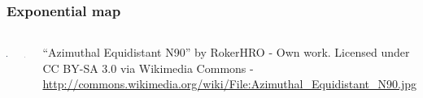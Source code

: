 \begin{frame}
\frametitle{Exponential map}
\begin{columns}[c]
\includegraphics[width=\textwidth]{900px-Azimuthal_Equidistant_N90}
\begin{center}
\includegraphics[width=\textwidth]{spheres}
\end{center}
\begin{tiny}
``Azimuthal Equidistant N90'' by RokerHRO - Own work. Licensed under CC BY-SA 3.0 via Wikimedia Commons - \url{http://commons.wikimedia.org/wiki/File:Azimuthal\_Equidistant\_N90.jpg}\par
\end{tiny}
\end{columns}
\end{frame}

